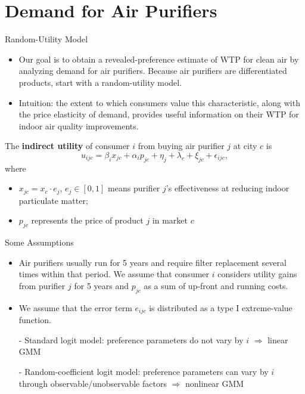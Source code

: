 \documentclass{beamer}
\begin{document}
\section{Demand for Air Purifiers}
\begin{frame}[shrink]
	\transfade %
	\tableofcontents[sectionstyle=show/shaded,subsectionstyle=show/shaded/hide]
	\addtocounter{framenumber}{-1}
\end{frame}
\begin{frame}{Random-Utility Model}
	\begin{itemize}
		\item Our goal is to obtain a revealed-preference estimate of WTP for clean air by analyzing demand for air purifiers. Because air purifiers are differentiated products, start with a random-utility model.
		\item Intuition: the extent to which consumers value this characteristic, along with the price elasticity of demand, provides useful information on their WTP for indoor air quality improvements.
	\end{itemize}
	The \textbf{indirect utility} of consumer $i$ from buying air purifier $j$ at city $c$ is
	\begin{equation}
		u_{ijc}=\beta_ix_{jc}+\alpha_ip_{jc}+\eta_j+\lambda_c+\xi_{jc}+\epsilon_{ijc}, \label{eq1}
	\end{equation}
	where
	\begin{itemize}
		\item $x_{jc}=x_c\cdot e_j$, $e_j\in[0,1]$ means purifier $j$'s effectiveness at reducing indoor particulate matter;
		\item $p_{jc}$ represents the price of product $j$ in market $c$
	\end{itemize}
\end{frame}
\begin{frame}{Some Assumptions}
	\begin{itemize}
		\item Air purifiers usually run for 5 years and require filter replacement several times within that period. We assume that consumer $i$ considers utility
		gains from purifier $j$ for 5 years and $p_{jc}$ as a sum of up-front and running costs.
		\item We assume that the error term $e_{ijc}$ is distributed as a type I extreme-value function.
		\item [-] Standard logit model: preference parameters do not vary by $i$ $\Rightarrow$ linear GMM
		\item [-] Random-coefficient logit model: preference parameters can vary by $i$ through observable/unobservable factors $\Rightarrow$ nonlinear GMM
	\end{itemize}
\end{frame}
\end{document}
